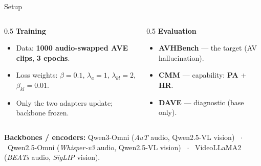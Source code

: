\documentclass[aspectratio=169,11pt]{beamer}
\begin{document}
\begin{frame}{Setup}
\begin{columns}[T]
\begin{column}{0.5\textwidth}
\textbf{Training}
\begin{itemize}\small
\item Data: \textbf{1000 audio-swapped AVE clips}, \textbf{3 epochs}.
\item Loss weights: $\beta{=}0.1$, $\lambda_a{=}1$, $\lambda_{kl}{=}2$, $\beta_{kl}{=}0.01$.
\item Only the two adapters update; backbone frozen.
\end{itemize}
\end{column}
\begin{column}{0.5\textwidth}
\textbf{Evaluation}
\begin{itemize}\small
\item \textbf{AVHBench} --- the target (AV hallucination).
\item \textbf{CMM} --- capability: \textbf{PA} + \textbf{HR}.
\item \textbf{DAVE} --- diagnostic (base only).
\end{itemize}
\end{column}
\end{columns}
\vfill
{\footnotesize\textbf{Backbones / encoders:} Qwen3-Omni (\emph{AuT} audio, Qwen2.5-VL vision) \ $\cdot$ \ Qwen2.5-Omni (\emph{Whisper-v3} audio, Qwen2.5-VL vision) \ $\cdot$ \ VideoLLaMA2 (\emph{BEATs} audio, \emph{SigLIP} vision).}
\end{frame}
\end{document}
